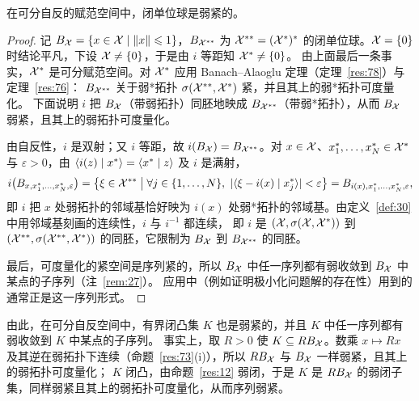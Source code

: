 \begin{corollary}
\label{res:79}
在可分自反的赋范空间中，闭单位球是弱紧的。
\end{corollary}

\begin{proof}
记 $B_{\mathcal{X}}=\{x\in\mathcal{X}\mid\lVert x\rVert\leqslant1\}$，$B_{\mathcal{X}^{**}}$ 为 $\mathcal{X}^{**}=(\mathcal{X}^{*})^*$ 的闭单位球。$\mathcal{X}=\{0\}$ 时结论平凡，下设 $\mathcal{X}\neq\{0\}$，于是由 $i$ 等距知 $\mathcal{X}^{*}\neq\{0\}$。
由上面最后一条事实，$\mathcal{X}^{*}$ 是可分赋范空间。对 $\mathcal{X}^{*}$ 应用 Banach--Alaoglu 定理（定理~\ref{res:78}）与定理~\ref{res:76}：
$B_{\mathcal{X}^{**}}$ 关于弱*拓扑 $\sigma(\mathcal{X}^{**},\mathcal{X}^{*})$ 紧，并且其上的弱*拓扑可度量化。
下面说明 $i$ 把 $B_{\mathcal{X}}$（带弱拓扑）同胚地映成 $B_{\mathcal{X}^{**}}$（带弱*拓扑），从而 $B_{\mathcal{X}}$ 弱紧，且其上的弱拓扑可度量化。

由自反性，$i$ 是双射；又 $i$ 等距，故 $i(B_{\mathcal{X}})=B_{\mathcal{X}^{**}}$。对 $x\in\mathcal{X}$、$x^*_1,\dots,x^*_N\in\mathcal{X}^{*}$ 与 $\varepsilon>0$，由 $\langle i(z) \mid x^*\rangle=\langle x^* \mid z\rangle$ 及 $i$ 是满射，
\[
  i\bigl(B_{x,x^*_1,\dots,x^*_N,\varepsilon}\bigr)
  =\bigl\{\xi\in\Xss\bigm|\forall j\in\{1,\dots,N\},\ \abs{\pair{\xi-i(x)}{x^*_j}}<\varepsilon\bigr\}
  =B_{i(x),x^*_1,\dots,x^*_N,\varepsilon},
\]
即 $i$ 把 $x$ 处弱拓扑的邻域基恰好映为 $i(x)$ 处弱*拓扑的邻域基。由定义~\ref{def:30} 中用邻域基刻画的连续性，$i$ 与 $i^{-1}$ 都连续，
即 $i$ 是 $(\mathcal{X},\sigma(\mathcal{X},\mathcal{X}^{*}))$ 到 $(\mathcal{X}^{**},\sigma(\mathcal{X}^{**},\mathcal{X}^{*}))$ 的同胚，它限制为 $B_{\mathcal{X}}$ 到 $B_{\mathcal{X}^{**}}$ 的同胚。

最后，可度量化的紧空间是序列紧的，所以 $B_{\mathcal{X}}$ 中任一序列都有弱收敛到 $B_{\mathcal{X}}$ 中某点的子序列（注~\ref{rem:27}）。
应用中（例如证明极小化问题解的存在性）用到的通常正是这一序列形式。
\end{proof}

\begin{remark}
由此，在可分自反空间中，有界闭凸集 $K$ 也是弱紧的，并且 $K$ 中任一序列都有弱收敛到 $K$ 中某点的子序列。
事实上，取 $R>0$ 使 $K\subseteq RB_{\mathcal{X}}$。数乘 $x\mapsto Rx$ 及其逆在弱拓扑下连续（命题~\ref{res:73}(i)），所以 $RB_{\mathcal{X}}$ 与 $B_{\mathcal{X}}$ 一样弱紧，且其上的弱拓扑可度量化；
$K$ 闭凸，由命题~\ref{res:12} 弱闭，于是 $K$ 是 $RB_{\mathcal{X}}$ 的弱闭子集，同样弱紧且其上的弱拓扑可度量化，从而序列弱紧。
\end{remark}

